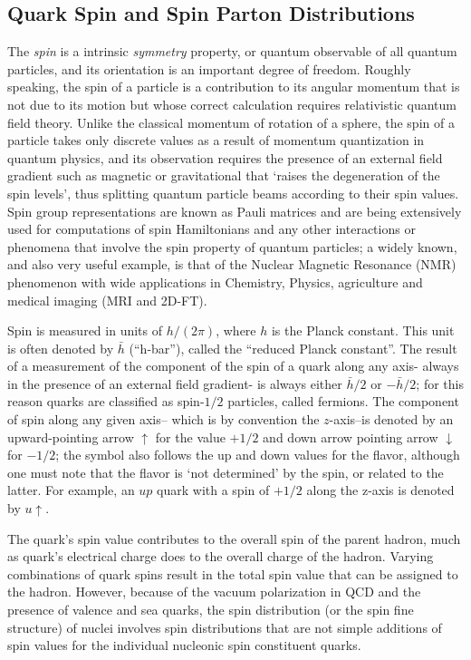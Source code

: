 \documentclass[12pt]{article}
\theoremstyle{plain}
\theoremstyle{definition}
\numberwithin{equation}{section}
\begin{document}
\subsection{Quark Spin and Spin Parton Distributions}

 The {\em spin} is a intrinsic \emph{symmetry} property, or quantum observable of all quantum particles, and its orientation is an important degree of freedom. Roughly speaking, the spin of a particle is a contribution to its angular momentum that is not due to its motion but whose correct calculation requires relativistic quantum field theory. Unlike the classical momentum of rotation of a sphere, the spin of a particle takes only discrete values as a result of momentum quantization in quantum physics, and its observation requires the presence of an external field gradient such as magnetic or gravitational that `raises the degeneration of the spin levels', thus splitting quantum particle beams according to their spin values. Spin group representations are known as Pauli matrices and are being extensively used for
computations of spin Hamiltonians and any other interactions or phenomena that involve the spin property of quantum particles; a widely known, and also very useful example, is that of the Nuclear Magnetic Resonance (NMR) phenomenon with wide applications in Chemistry, Physics, agriculture and medical imaging (MRI and 2D-FT). 

Spin is measured in units of $h/(2 \pi)$, where $h$ is the Planck constant. This unit is often denoted by $\bar{h}$ (``h-bar''), called the ``reduced Planck constant''. The result of a measurement of the component of the spin of a quark along any axis- always in the presence of an external field gradient- is always either $\bar{h}/2$ or $- \bar{h}/2$; for this reason quarks are classified as spin-$1/2$ particles, called fermions. The component of spin along any given axis-- which is by convention the $z$-axis--is denoted by an upward-pointing arrow $\uparrow$ for the value $+1/2$ and down arrow pointing arrow  $\downarrow$ for $-1/2$; the symbol also follows the up and down values for the flavor, although one must note that the flavor is `not determined' by the spin, or related to the latter. For example, an $up$ quark with a spin of $+1/2$ along the z-axis is denoted by $u \uparrow$.

 The quark's spin value contributes to the overall spin of the parent hadron, much as quark's electrical charge does to the overall charge of the hadron. Varying combinations of quark spins result in the total spin value that can be assigned to the hadron. However, because of the vacuum polarization in QCD and the presence of valence and sea quarks, the spin distribution (or the spin fine structure) of nuclei involves spin distributions that are not simple additions of spin values for the individual nucleonic spin constituent quarks. 
\end{document}
